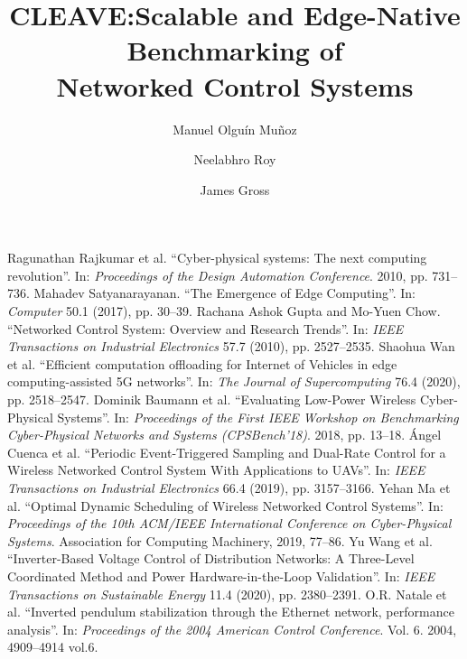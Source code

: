 \documentclass[sigconf,9pt,natbib=false]{acmart}
\title[CLEAVE]{CLEAVE:\@ Scalable and Edge-Native Benchmarking of\\{Networked Control Systems}}
\author{Manuel {Olguín Muñoz}}
\affiliation{%
\institution{KTH Royal Institute of Technology}%
\city{Stockholm}%
\country{Sweden}%
}
\author{Neelabhro Roy}
\affiliation{%
\institution{KTH Royal Institute of Technology}%
\city{Stockholm}%
\country{Sweden}%
}
\author{James Gross}
\affiliation{%
\institution{KTH Royal Institute of Technology}%
\city{Stockholm}%
\country{Sweden}%
}
\begin{document}
\maketitle
\renewcommand{\shortauthors}{{Olguín Muñoz} et al.}







\begin{thebibliography}{99}
  Ragunathan Rajkumar et al. “Cyber-physical systems: The next computing revolution”. In: \emph{Proceedings of the Design Automation Conference}. 2010, pp. 731–736.
  Mahadev Satyanarayanan. “The Emergence of Edge Computing”. In: \emph{Computer} 50.1 (2017), pp. 30–39.
  Rachana Ashok Gupta and Mo-Yuen Chow. “Networked Control System: Overview and Research Trends”. In: \emph{IEEE Transactions on Industrial Electronics} 57.7 (2010), pp. 2527–2535. %
  Shaohua Wan et al. “Efficient computation offloading for {Internet of Vehicles} in edge computing-assisted 5G networks”. In: \emph{The Journal of Supercomputing} 76.4 (2020), pp. 2518–2547. %
  Dominik Baumann et al. “Evaluating Low-Power Wireless Cyber-Physical Systems”. In: \emph{Proceedings of the First IEEE Workshop on Benchmarking Cyber-Physical Networks and Systems (CPSBench’18)}. 2018, pp. 13–18.
  Ángel Cuenca et al. “Periodic Event-Triggered Sampling and Dual-Rate Control for a Wireless Networked Control System With Applications to {UAVs}”. In: \emph{IEEE Transactions on Industrial Electronics} 66.4 (2019), pp. 3157–3166.
  Yehan Ma et al. “Optimal Dynamic Scheduling of Wireless Networked Control Systems”. In: \emph{Proceedings of the 10th ACM/IEEE International Conference on Cyber-Physical Systems}. Association for Computing Machinery, 2019, 77–86.
  Yu Wang et al. “Inverter-Based Voltage Control of Distribution Networks: A Three-Level Coordinated Method and Power Hardware-in-the-Loop Validation”. In: \emph{IEEE Transactions on Sustainable Energy} 11.4 (2020), pp. 2380–2391.
  O.R. Natale et al. “Inverted pendulum stabilization through the {Ethernet} network, performance analysis”. In: \emph{Proceedings of the 2004 American Control Conference}. Vol. 6. 2004, 4909–4914 vol.6.

\end{thebibliography}
\end{document}
